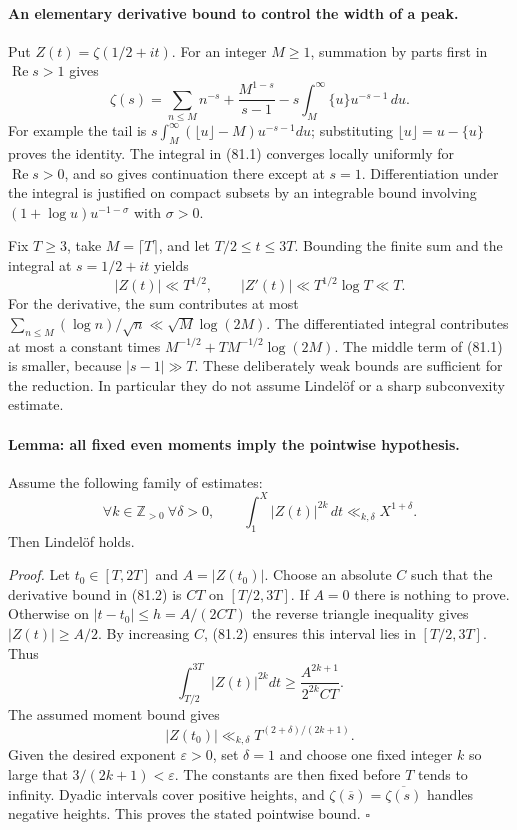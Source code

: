 \documentclass[11pt]{article}
\begin{document}
\paragraph{An elementary derivative bound to control the width of a peak.}
Put $Z(t)=\zeta(1/2+it)$. For an integer $M\geq1$, summation by parts first
in $\operatorname{Re}s>1$ gives
\[
 \zeta(s)=\sum_{n\leq M}n^{-s}+\frac{M^{1-s}}{s-1}
       -s\int_M^\infty\{u\}u^{-s-1}\,du.                 \tag{81.1}
\]
For example the tail is $s\int_M^\infty(\lfloor u\rfloor-M)u^{-s-1}du$;
substituting $\lfloor u\rfloor=u-\{u\}$ proves the identity. The integral
in (81.1) converges locally uniformly for $\operatorname{Re}s>0$, and so
gives continuation there except at $s=1$. Differentiation under the integral
is justified on compact subsets by an integrable bound involving
$(1+\log u)u^{-1-\sigma}$ with $\sigma>0$.

Fix $T\geq3$, take $M=\lceil T\rceil$, and let $T/2\leq t\leq3T$.
Bounding the finite sum and the integral at $s=1/2+it$ yields
\[
 |Z(t)|\ll T^{1/2},\qquad |Z'(t)|\ll T^{1/2}\log T\ll T. \tag{81.2}
\]
For the derivative, the sum contributes at most
$\sum_{n\leq M}(\log n)/\sqrt n\ll\sqrt M\log(2M)$.
The differentiated integral contributes at most a constant times
$M^{-1/2}+T M^{-1/2}\log(2M)$. The middle term of (81.1) is smaller,
because $|s-1|\gg T$. These deliberately weak bounds are sufficient for
the reduction. In particular they do not assume Lindelöf or a sharp
subconvexity estimate.

\paragraph{Lemma: all fixed even moments imply the pointwise hypothesis.}
Assume the following family of estimates:
\[
 \forall k\in\mathbb Z_{>0}\ \forall\delta>0,\qquad
 \int_1^X|Z(t)|^{2k}\,dt\ll_{k,\delta}X^{1+\delta}.
                                                               \tag{81.3}
\]
Then Lindelöf holds.

\emph{Proof.} Let $t_0\in[T,2T]$ and $A=|Z(t_0)|$. Choose an absolute
$C$ such that the derivative bound in (81.2) is $CT$ on $[T/2,3T]$.
If $A=0$ there is nothing to prove. Otherwise on
$|t-t_0|\leq h=A/(2CT)$ the reverse triangle inequality gives
$|Z(t)|\geq A/2$. By increasing $C$, (81.2) ensures this interval lies
in $[T/2,3T]$. Thus
\[
 \int_{T/2}^{3T}|Z(t)|^{2k}dt
       \geq \frac{A^{2k+1}}{2^{2k}CT}.
\]
The assumed moment bound gives
\[
 |Z(t_0)|\ll_{k,\delta}T^{(2+\delta)/(2k+1)}.             \tag{81.4}
\]
Given the desired exponent $\varepsilon>0$, set $\delta=1$ and choose
one fixed integer $k$ so large that $3/(2k+1)<\varepsilon$.
The constants are then fixed before $T$ tends to infinity. Dyadic intervals
cover positive heights, and $\zeta(\overline s)=\overline{\zeta(s)}$
handles negative heights. This proves the stated pointwise bound.
\hfill$\square$
\end{document}
